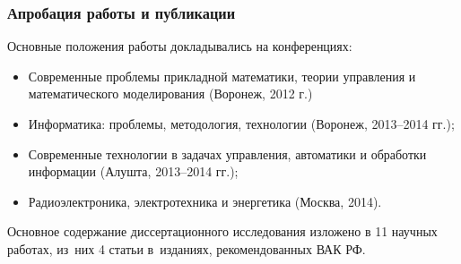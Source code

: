 \documentclass[12pt]{beamer}
\begin{document}

\begin{frame}
  \frametitle{Апробация работы и публикации}
  Основные положения работы докладывались на конференциях:
  \begin{itemize}
    \item Современные проблемы прикладной математики, теории управления и математического моделирования (Воронеж, 2012 г.)
    \item Информатика: проблемы, методология, технологии (Воронеж, 2013--2014 гг.);
    \item Современные технологии в задачах управления, автоматики и обработки информации (Алушта, 2013--2014 гг.);
    \item Радиоэлектроника, электротехника и энергетика (Москва, 2014).
  \end{itemize}
  Основное содержание диссертационного исследования изложено в 11 научных работах, из~них 4 статьи в~изданиях, рекомендованных ВАК РФ.
\end{frame}
\end{document}
